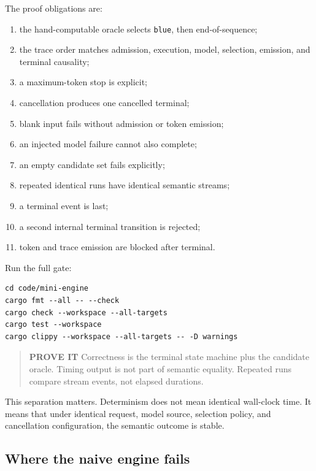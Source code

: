 \documentclass[
  10pt,
]{article}
\providecommand{\tightlist}{%
  \setlength{\itemsep}{0pt}\setlength{\parskip}{0pt}}
\begin{document}
The proof obligations are:

\begin{enumerate}
\def\labelenumi{\arabic{enumi}.}
\tightlist
\item
  the hand-computable oracle selects \texttt{blue}, then
  end-of-sequence;
\item
  the trace order matches admission, execution, model, selection,
  emission, and terminal causality;
\item
  a maximum-token stop is explicit;
\item
  cancellation produces one cancelled terminal;
\item
  blank input fails without admission or token emission;
\item
  an injected model failure cannot also complete;
\item
  an empty candidate set fails explicitly;
\item
  repeated identical runs have identical semantic streams;
\item
  a terminal event is last;
\item
  a second internal terminal transition is rejected;
\item
  token and trace emission are blocked after terminal.
\end{enumerate}

Run the full gate:

\begin{verbatim}
cd code/mini-engine
cargo fmt --all -- --check
cargo check --workspace --all-targets
cargo test --workspace
cargo clippy --workspace --all-targets -- -D warnings
\end{verbatim}

\begin{quote}
\textbf{PROVE IT} Correctness is the terminal state machine plus the
candidate oracle. Timing output is not part of semantic equality.
Repeated runs compare stream events, not elapsed durations.
\end{quote}

This separation matters. Determinism does not mean identical wall-clock
time. It means that under identical request, model source, selection
policy, and cancellation configuration, the semantic outcome is stable.

\subsection{Where the naive engine
fails}\label{where-the-naive-engine-fails}
\end{document}
